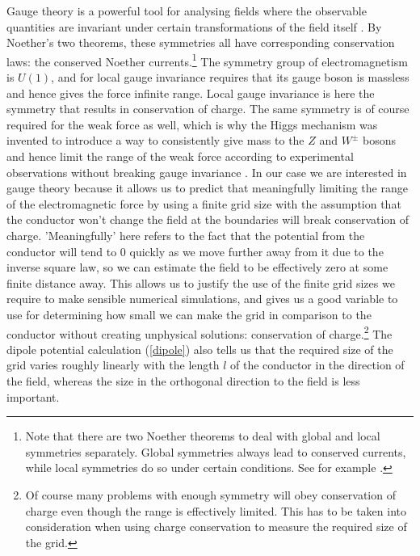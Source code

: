 \documentclass[aps,twocolumn,pre,nofootinbib,10pt]{revtex4-1}
\begin{document}
Gauge theory is a powerful tool for analysing fields where the observable quantities are invariant under certain transformations of the field itself \cite{gaugetheory1}. By Noether's two theorems, these symmetries all have corresponding conservation laws: the conserved Noether currents.\footnote{Note that there are two Noether theorems to deal with global and local symmetries separately. Global symmetries always lead to conserved currents, while local symmetries do so under certain conditions. See for example \cite{gaugetheory2}.} The symmetry group of electromagnetism is $U(1)$, and for local gauge invariance requires that its gauge boson is massless and hence gives the force infinite range. Local gauge invariance is here the symmetry that results in conservation of charge. The same symmetry is of course required for the weak force as well, which is why the Higgs mechanism was invented to introduce a way to consistently give mass to the 
$Z$ and $W^{\pm}$ bosons and hence limit the range of the weak force according to experimental observations without breaking gauge invariance \cite{gaugetheory3}. In our case we are interested in gauge theory because it allows us to predict that meaningfully limiting the range of the electromagnetic force by using a finite grid size with the assumption that the conductor won't change the field at the 
boundaries will break conservation of charge. 'Meaningfully' here refers to the fact that the potential from the conductor will tend to 0 quickly as we move further away from it due to the inverse square law, so we can estimate the field to be effectively zero at some finite distance away. This allows us to justify the use of the finite grid sizes we require to make sensible numerical simulations, and gives us a good variable to use for determining how small we can make the grid in comparison to the conductor without creating unphysical solutions: conservation of charge.\footnote{Of course many problems with enough symmetry will obey conservation of charge even though the range is effectively limited. This has to be taken into consideration when using charge conservation to measure the required size of the grid.} The dipole potential calculation (\ref{dipole}) also tells us that the required size of the grid varies roughly linearly with the length $l$ of the conductor in the direction of the field, whereas 
the size in the 
orthogonal direction to the field is less important.
\end{document}
